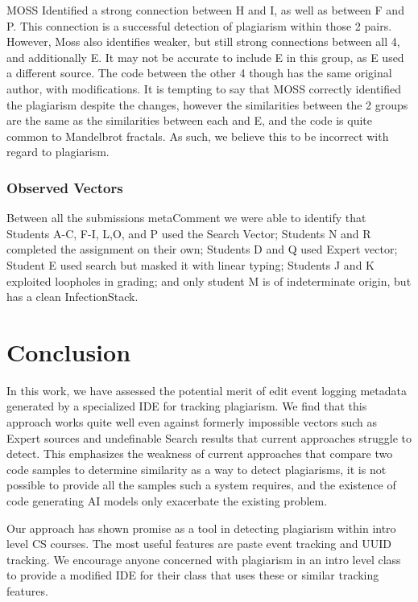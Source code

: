 \documentclass[letterpaper,10pt,conference]{IEEEtran}
\newcommand{\metaComment}{metaComment\xspace}
\newcommand{\infectionStack}{InfectionStack\xspace}
\begin{document}
MOSS Identified a strong connection between H and I, as well as between F and P.  This connection is a successful detection of plagiarism within those 2 pairs. However, Moss also identifies weaker, but still strong connections between all 4, and additionally E.  It may not be accurate to include E in this group, as E used a different source.  The code between the other 4 though has the same original author, with modifications.  It is tempting to say that MOSS correctly identified the plagiarism despite the changes, however the similarities between the 2 groups are the same as the similarities between each and E, and the code is quite common to Mandelbrot fractals.  As such, we believe this to be incorrect with regard to plagiarism.



\subsubsection{Observed Vectors}
Between all the submissions \metaComment we were able to identify that Students A-C, F-I, L,O, and P used the Search Vector; Students N and R completed the assignment on their own; Students D and Q used Expert vector; Student E used search but masked it with linear typing; Students J and K exploited loopholes in grading; and only student M is of indeterminate origin, but has a clean \infectionStack.



\section{Conclusion}
In this work, we have assessed the potential merit of edit event logging metadata generated by a specialized IDE for tracking plagiarism.  We find that this approach works quite well even against formerly impossible vectors such as Expert sources and undefinable Search results that current approaches struggle to detect.  This emphasizes the weakness of current approaches that compare two code samples to determine similarity as a way to detect plagiarisms, it is not possible to provide all the samples such a system requires, and the existence of code generating AI models only exacerbate the existing problem.

Our approach has shown promise as a tool in detecting plagiarism within intro level CS courses.  The most useful features are paste event tracking and UUID tracking.  We encourage anyone concerned with plagiarism in an intro level class to provide a modified IDE for their class that uses these or similar tracking features.
\end{document}
